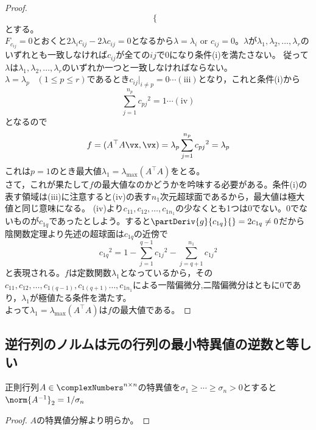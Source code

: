\begin{proof}
\begin{equation*}
\begin{cases}
                    \end{cases}
                \end{equation*}
                とする。\\
                $F_{c_{ij}} = 0$とおくと$2\lambda_i c_{ij} - 2\lambda c_{ij} = 0$となるから$\lambda = \lambda_i$ or $c_{ij} = 0$。$\lambda$が$\lambda_1,\lambda_2,\dots,\lambda_r$のいずれとも一致しなければ$c_{ij}$が全ての$ij$で0になり条件(i)を満たさない。
                従って$\lambda$は$\lambda_1,\lambda_2,\dots,\lambda_r$のいずれか一つと一致しなければならない。\\
                $\lambda = \lambda_p \;\;\;(1 \leq p \leq r)$であるとき$c_{ij}|_{i \neq p} = 0\cdots(\text{iii})$となり，これと条件(i)から
                \[\sum_{j=1}^{n_p}{c_{pj}}^2 = 1\cdots(\text{iv})\]
                となるので
                \[f = (A^\top A\vx,\vx) = \lambda_p\sum_{j=1}^{n_p}{c_{pj}}^2 = \lambda_p\]
                これは$p=1$のとき最大値$\lambda_1 = \lambda_{\mathrm{max}}(A^\top A)$をとる。\\
                さて，これが果たして$f$の最大値なのかどうかを吟味する必要がある。条件(i)の表す領域は(iii)に注意すると(iv)の表す$n_1$次元超球面であるから，最大値は極大値と同じ意味になる。
                (iv)より$c_{11},c_{12},\dots,c_{1n_1}$の少なくとも1つは0でない。0でないものが$c_{1q}$であったとしよう。すると$\partDeriv{g}{c_{1q}}{} = 2c_{1q} \neq 0$だから陰関数定理より先述の超球面は$c_{1q}$の近傍で
                \[{c_{1q}}^2 = 1 - \sum_{j=1}^{q-1}{{c_{1j}}^2} - \sum_{j=q+1}^{n_1}{{c_{1j}}^2}\]
                と表現される。$f$は定数関数$\lambda_1$となっているから，その$c_{11},c_{12},\dots,c_{1(q-1)},c_{1(q+1)}\dots,c_{1n_1}$による一階偏微分,二階偏微分はともに0であり，$\lambda_1$が極値たる条件を満たす。\\
                よって$\lambda_1 = \lambda_{\mathrm{max}}(A^\top A)$は$f$の最大値である。
            \end{proof}
        \subsection{逆行列のノルムは元の行列の最小特異値の逆数と等しい}
            \begin{shadebox}
                正則行列$A\in\complexNumbers^{n\times n}$の特異値を$\sigma_1\geq\dotsb\geq\sigma_n>0$とすると$\norm{A^{-1}}_2=1/\sigma_n$
            \end{shadebox}
            \begin{proof}
                $A$の特異値分解より明らか。
            \end{proof}
